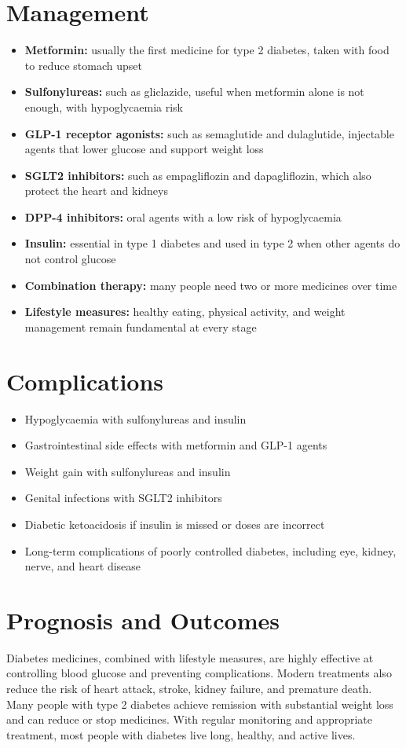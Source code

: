 \section*{Management}
\begin{itemize}
    \item \textbf{Metformin:} usually the first medicine for type 2 diabetes, taken with food to reduce stomach upset
    \item \textbf{Sulfonylureas:} such as gliclazide, useful when metformin alone is not enough, with hypoglycaemia risk
    \item \textbf{GLP-1 receptor agonists:} such as semaglutide and dulaglutide, injectable agents that lower glucose and support weight loss
    \item \textbf{SGLT2 inhibitors:} such as empagliflozin and dapagliflozin, which also protect the heart and kidneys
    \item \textbf{DPP-4 inhibitors:} oral agents with a low risk of hypoglycaemia
    \item \textbf{Insulin:} essential in type 1 diabetes and used in type 2 when other agents do not control glucose
    \item \textbf{Combination therapy:} many people need two or more medicines over time
    \item \textbf{Lifestyle measures:} healthy eating, physical activity, and weight management remain fundamental at every stage
\end{itemize}

\section*{Complications}
\begin{itemize}
    \item Hypoglycaemia with sulfonylureas and insulin
    \item Gastrointestinal side effects with metformin and GLP-1 agents
    \item Weight gain with sulfonylureas and insulin
    \item Genital infections with SGLT2 inhibitors
    \item Diabetic ketoacidosis if insulin is missed or doses are incorrect
    \item Long-term complications of poorly controlled diabetes, including eye, kidney, nerve, and heart disease
\end{itemize}

\section*{Prognosis and Outcomes}
Diabetes medicines, combined with lifestyle measures, are highly effective at controlling blood glucose and preventing complications. Modern treatments also reduce the risk of heart attack, stroke, kidney failure, and premature death. Many people with type 2 diabetes achieve remission with substantial weight loss and can reduce or stop medicines. With regular monitoring and appropriate treatment, most people with diabetes live long, healthy, and active lives.

